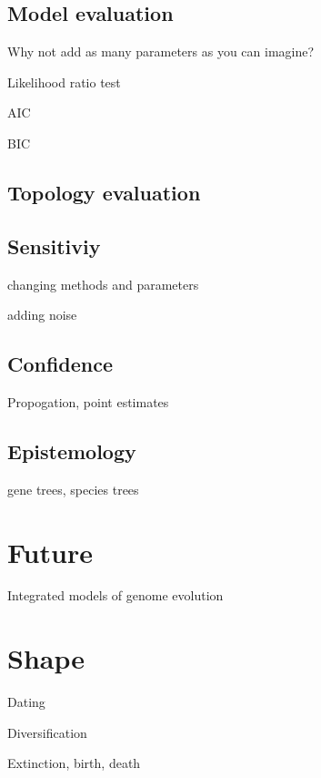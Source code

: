 \documentclass[
]{book}
\begin{document}
\hypertarget{model-evaluation}{%
\section{Model evaluation}\label{model-evaluation}}

Why not add as many parameters as you can imagine?

Likelihood ratio test

AIC

BIC

\hypertarget{topology-evaluation}{%
\section{Topology evaluation}\label{topology-evaluation}}

\hypertarget{sensitiviy}{%
\section{Sensitiviy}\label{sensitiviy}}

changing methods and parameters

adding noise

\hypertarget{confidence}{%
\section{Confidence}\label{confidence}}

Propogation, point estimates

\hypertarget{epistemology}{%
\section{Epistemology}\label{epistemology}}

gene trees, species trees

\hypertarget{future}{%
\chapter{Future}\label{future}}

Integrated models of genome evolution

\hypertarget{shape}{%
\chapter{Shape}\label{shape}}

Dating

Diversification

Extinction, birth, death
\end{document}

